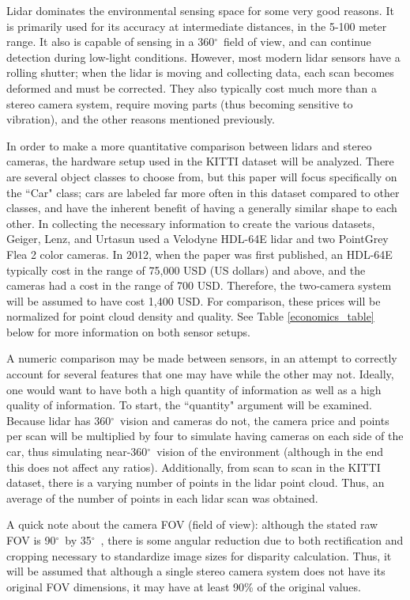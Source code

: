 \def \deg {$ ^{\circ}$\ } %
Lidar dominates the environmental sensing space for some very good reasons. It is primarily used for its accuracy at intermediate distances, in the 5-100 meter range. It also is capable of sensing in a 360\deg field of view, and can continue detection during low-light conditions. However, most modern lidar sensors have a rolling shutter; when the lidar is moving and collecting data, each scan becomes deformed and must be corrected. They also typically cost much more than a stereo camera system, require moving parts (thus becoming sensitive to vibration), and the other reasons mentioned previously.

In order to make a more quantitative comparison between lidars and stereo cameras, the hardware setup used in the KITTI dataset will be analyzed. There are several object classes to choose from, but this paper will focus specifically on the ``Car" class; cars are labeled far more often in this dataset compared to other classes, and have the inherent benefit of having a generally similar shape to each other. In collecting the necessary information to create the various datasets, Geiger, Lenz, and Urtasun \cite{geiger_are_2012} used a Velodyne HDL-64E lidar and two PointGrey Flea 2 color cameras. In 2012, when the paper was first published, an HDL-64E typically cost in the range of 75,000 USD (US dollars) and above, and the cameras had a cost in the range of 700 USD. Therefore, the two-camera system will be assumed to have cost 1,400 USD. For comparison, these prices will be normalized for point cloud density and quality. See Table \ref{economics_table} below for more information on both sensor setups.

A numeric comparison may be made between sensors, in an attempt to correctly account for several features that one may have while the other may not. Ideally, one would want to have both a high quantity of information as well as a high quality of information. To start, the ``quantity" argument will be examined. Because lidar has 360\deg vision and cameras do not, the camera price and points per scan will be multiplied by four to simulate having cameras on each side of the car, thus simulating near-360\deg vision of the environment (although in the end this does not affect any ratios). Additionally, from scan to scan in the KITTI dataset, there is a varying number of points in the lidar point cloud. Thus, an average of the number of points in each lidar scan was obtained.

A quick note about the camera FOV (field of view): although the stated raw FOV is 90\deg by 35\deg, there is some angular reduction due to both rectification and cropping necessary to standardize image sizes for disparity calculation. Thus, it will be assumed that although a single stereo camera system does not have its original FOV dimensions, it may have at least 90\% of the original values.

